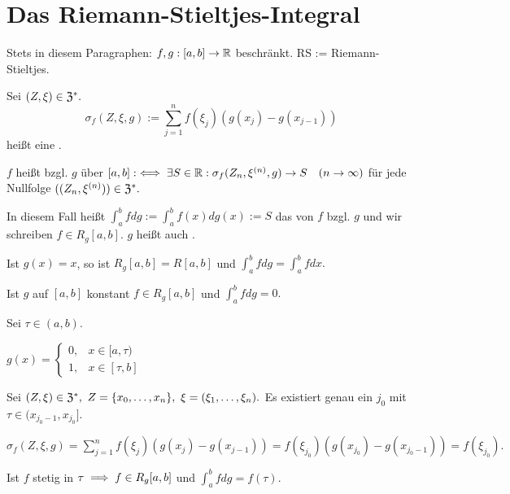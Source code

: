 \documentclass[a4paper,twoside,DIV15,BCOR12mm]{scrbook}
\begin{document}
\def\intab*{\int_a^b}
\chapter{Das Riemann-Stieltjes-Integral}
\theoremstyle{nonumberbreak}
\newtheorem{bezeichnungen}{Bezeichnungen}

Stets in diesem Paragraphen: $f,g:[a,b] \to \mathbb{R}$ beschränkt. RS := Riemann-Stieltjes.

\begin{definition}
\begin{liste}
\item Sei $(Z,\xi) \in \mathfrak{Z}^*.$ $$\sigma_f(Z,\xi,g) := \sum_{j=1}^nf(\xi_j)(g(x_j)-g(x_{j-1}))$$ heißt eine .
\item $f$ heißt  bzgl. $g$ über $[a,b] :\iff \exists S \in \mathbb{R}: \sigma_f(Z_n,\xi^{(n)},g) \to S\quad (n \to \infty)$ für jede Nullfolge $((Z_n,\xi^{(n)})) \in \mathfrak{Z}^*.$

In diesem Fall heißt $\intab* fdg := \intab* f(x)dg(x) := S$ das  von $f$ bzgl. $g$ und wir schreiben $f \in R_g[a,b]$. $g$ heißt auch .
\end{liste}
\end{definition}

\begin{beispiele}
\item Ist $g(x)=x$, so ist $R_g[a,b] = R[a,b]$ und $\intab* fdg = \intab* fdx.$
\item Ist $g$ auf $[a,b]$ konstant \folgt $f \in R_g[a,b]$ und $\intab* fdg = 0.$
\item Sei $\tau \in (a,b).$

$g(x) = \begin{cases} 0,& x \in [a,\tau) \\ 1,& x \in [\tau,b] \end{cases}$

Sei $(Z,\xi) \in \mathfrak{Z}^*,\ Z = \{x_0,\ldots,x_n\},\ \xi = (\xi_1,\ldots,\xi_n).$ Es existiert genau ein $j_0$ mit $\tau \in (x_{j_0-1},x_{j_0}]$.

$\sigma_f(Z,\xi,g) = \sum_{j=1}^nf(\xi_j)(g(x_j)-g(x_{j-1})) = f(\xi_{j_0})(g(x_{j_0}) - g(x_{{j_0}-1})) = f(\xi_{j_0}).$

Ist $f$ stetig in $\tau \implies f \in R_g[a,b]$ und $\intab* fdg = f(\tau).$
\end{beispiele}
\end{document}
